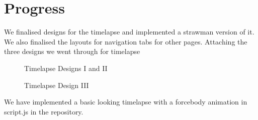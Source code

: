 \documentclass{report}
\begin{document}
\section{Progress}
We finalised designs for the timelapse and implemented a strawman version of it.
We also finalised the layouts for navigation tabs for other pages.
Attaching the three designs we went through for timelapse
\begin{figure}[H]
	\caption{Timelapse Designs I and II}
	\label{Fig:4}
\end{figure}
\begin{figure}[H]
	\caption{Timelapse Design III}
	\label{Fig:5}
\end{figure}

We have implemented a basic looking timelapse with a forcebody animation in script.js in the repository.
\end{document}
